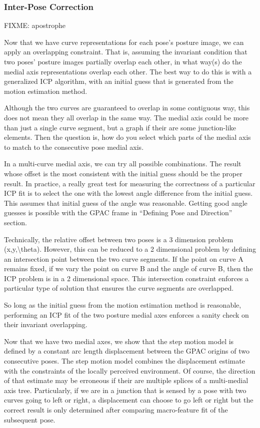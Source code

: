 \subsubsection{Inter-Pose Correction}
\label{inter-posecorrection}

FIXME: apostrophe

Now that we have curve representations for each pose's posture image, we can apply an overlapping constraint. That is, assuming the invariant condition that two poses' posture images partially overlap each other, in what way(s) do the medial axis representations overlap each other. The best way to do this is with a generalized ICP algorithm, with an initial guess that is generated from the motion estimation method.

Although the two curves are guaranteed to overlap in some contiguous way, this does not mean they all overlap in the same way. The medial axis could be more than just a single curve segment, but a graph if their are some junction-like elements. Then the question is, how do you select which parts of the medial axis to match to the consecutive pose medial axis.

In a multi-curve medial axis, we can try all possible combinations. The result whose offset is the most consistent with the initial guess should be the proper result. In practice, a really great test for measuring the correctness of a particular ICP fit is to select the one with the lowest angle difference from the initial guess. This assumes that initial guess of the angle was reasonable. Getting good angle guesses is possible with the GPAC frame in “Defining Pose and Direction” section.

Technically, the relative offset between two poses is a 3 dimension problem (x,y,\textbackslash{}theta). However, this can be reduced to a 2 dimensional problem by defining an intersection point between the two curve segments. If the point on curve A remains fixed, if we vary the point on curve B and the angle of curve B, then the ICP problem is in a 2 dimensional space. This intersection constraint enforces a particular type of solution that ensures the curve segments are overlapped.

So long as the initial guess from the motion estimation method is reasonable, performing an ICP fit of the two posture medial axes enforces a sanity check on their invariant overlapping. 

Now that we have two medial axes, we show that the step motion model is defined by a constant arc length displacement between the GPAC origins of two consecutive poses. The step motion model combines the displacement estimate with the constraints of the locally perceived environment. Of course, the direction of that estimate may be erroneous if their are multiple splices of a multi-medial axis tree. Particularly, if we are in a junction that is sensed by a pose with two curves going to left or right, a displacement can choose to go left or right but the correct result is only determined after comparing macro-feature fit of the subsequent pose.

